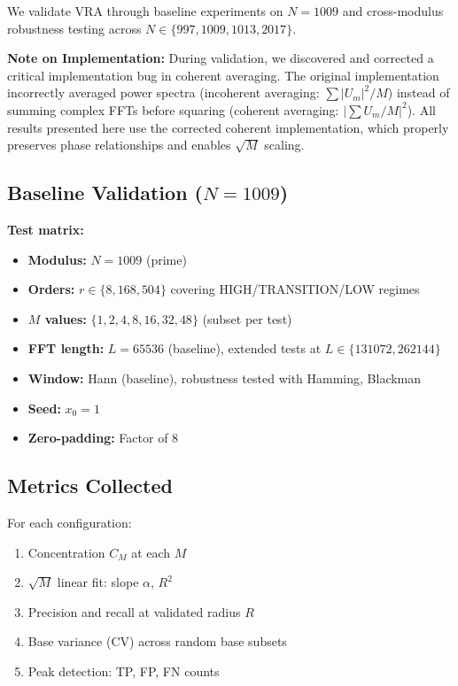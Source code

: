 We validate VRA through baseline experiments on $N=1009$ and cross-modulus robustness testing across $N \in \{997, 1009, 1013, 2017\}$.

\textbf{Note on Implementation:} During validation, we discovered and corrected a critical implementation bug in coherent averaging. The original implementation incorrectly averaged power spectra (incoherent averaging: $\sum |U_m|^2/M$) instead of summing complex FFTs before squaring (coherent averaging: $|\sum U_m/M|^2$). All results presented here use the corrected coherent implementation, which properly preserves phase relationships and enables $\sqrt{M}$ scaling.

\subsection{Baseline Validation ($N=1009$)}

\textbf{Test matrix:}
\begin{itemize}
    \item \textbf{Modulus:} $N = 1009$ (prime)
    \item \textbf{Orders:} $r \in \{8, 168, 504\}$ covering HIGH/TRANSITION/LOW regimes
    \item \textbf{$M$ values:} $\{1, 2, 4, 8, 16, 32, 48\}$ (subset per test)
    \item \textbf{FFT length:} $L = 65536$ (baseline), extended tests at $L \in \{131072, 262144\}$
    \item \textbf{Window:} Hann (baseline), robustness tested with Hamming, Blackman
    \item \textbf{Seed:} $x_0 = 1$
    \item \textbf{Zero-padding:} Factor of 8
\end{itemize}

\subsection{Metrics Collected}

For each configuration:
\begin{enumerate}
    \item Concentration $C_M$ at each $M$
    \item $\sqrt{M}$ linear fit: slope $\alpha$, $R^2$
    \item Precision and recall at validated radius $R$
    \item Base variance (CV) across random base subsets
    \item Peak detection: TP, FP, FN counts
\end{enumerate}

